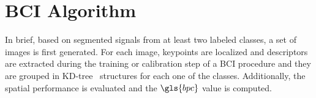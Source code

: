 %
%
%
%
%



\section{BCI Algorithm}

In brief, based on segmented signals from at least two labeled classes, a set of images is first generated.  For each image, keypoints are localized and descriptors are extracted during the training or calibration step of a BCI procedure and they are grouped in KD-tree~\cite{Lowe2004} structures for each one of the classes.  Additionally, the spatial performance is evaluated and the $\gls{bpc}$ value is computed.

